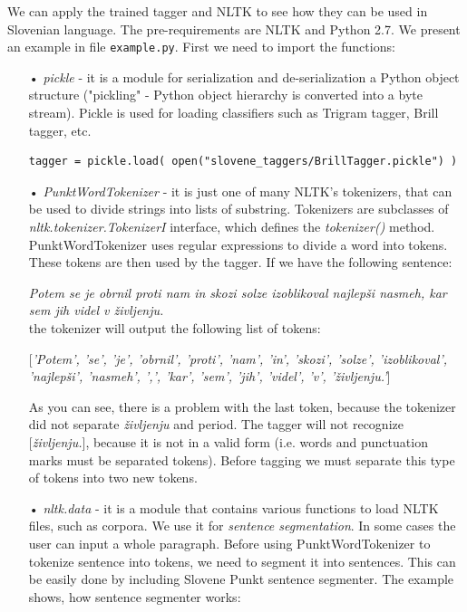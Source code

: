 \documentclass[10pt, conference, compsocconf]{IEEEtran}
\begin{document}
We can apply the trained tagger and NLTK to see how they can be used in Slovenian language. The pre-requirements are NLTK and Python 2.7. We present an example in file \texttt{example.py}.
First we need to import the functions:
\begin{itemize}
\item[•] \textit{pickle} - it is a module for serialization and de-serialization a Python object structure ("pickling" - Python object hierarchy is converted into a byte stream). Pickle is used for loading classifiers such as Trigram tagger, Brill tagger, etc.
\begin{lstlisting}
tagger = pickle.load( open("slovene_taggers/BrillTagger.pickle") )
\end{lstlisting}

\item[•] \textit{PunktWordTokenizer} \cite{tokenizer} - it is just one of many NLTK's tokenizers, that can be used to divide strings into lists of substring. Tokenizers are subclasses of \textit{nltk.tokenizer.TokenizerI} interface, which defines the \textit{tokenizer()} method. PunktWordTokenizer uses regular expressions to divide a word into tokens. These tokens are then used by the tagger.  If we have the following sentence:

\textit{Potem se je obrnil proti nam in skozi solze izoblikoval najlepši nasmeh, kar sem jih videl v življenju.}\\
the tokenizer will output the following list of tokens:

[\textit{'Potem', 'se', 'je', 'obrnil', 'proti', 'nam', 'in', 'skozi', 'solze', 'izoblikoval', 'najlepši', 'nasmeh', ',', 'kar', 'sem', 'jih', 'videl', 'v', 'življenju.'}]
\par

As you can see, there is a problem with the last token, because the tokenizer did not separate \textit{življenju} and period. The tagger will not recognize [\textit{življenju.}], because it is not in a valid form (i.e. words and punctuation marks must be separated tokens). Before tagging we must separate this type of tokens into two new tokens.

\item[•] \textit{nltk.data} - it is a module that contains various functions to load NLTK files, such as corpora. We use it for \textit{sentence segmentation}. In some cases the user can input a whole paragraph. Before using PunktWordTokenizer to tokenize sentence into tokens, we need to segment it into sentences. This can be easily done by including Slovene Punkt sentence segmenter. The example shows, how sentence segmenter works:


\end{itemize}
\end{document}
